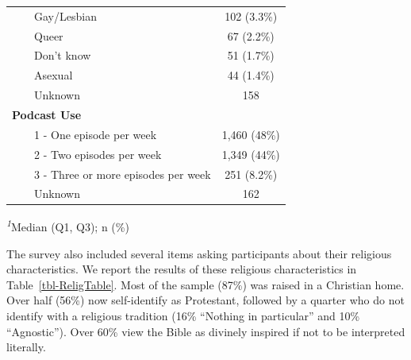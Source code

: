 \documentclass[
  letterpaper,
]{article}
\begin{document}
\begin{longtable}{lc}
    Gay/Lesbian & 102 (3.3\%) \\ 
    Queer & 67 (2.2\%) \\ 
    Don't know & 51 (1.7\%) \\ 
    Asexual & 44 (1.4\%) \\ 
    Unknown & 158 \\ 
{\bfseries Podcast Use} &  \\ 
    1 - One episode per week & 1,460 (48\%) \\ 
    2 - Two episodes per week & 1,349 (44\%) \\ 
    3 - Three or more episodes per week & 251 (8.2\%) \\ 
    Unknown & 162 \\ 
\bottomrule

\end{longtable}

\begin{minipage}{\linewidth}
\textsuperscript{\textit{1}}Median (Q1, Q3); n (\%)\\
\end{minipage}
\endgroup

The survey also included several items asking participants about their
religious characteristics. We report the results of these religious
characteristics in Table~\ref{tbl-ReligTable}. Most of the sample (87\%)
was raised in a Christian home. Over half (56\%) now self-identify as
Protestant, followed by a quarter who do not identify with a religious
tradition (16\% ``Nothing in particular'' and 10\% ``Agnostic''). Over
60\% view the Bible as divinely inspired if not to be interpreted
literally.

\begingroup
\fontsize{12.0pt}{14.4pt}\selectfont
\setlength{\LTpost}{0mm}
\end{document}
